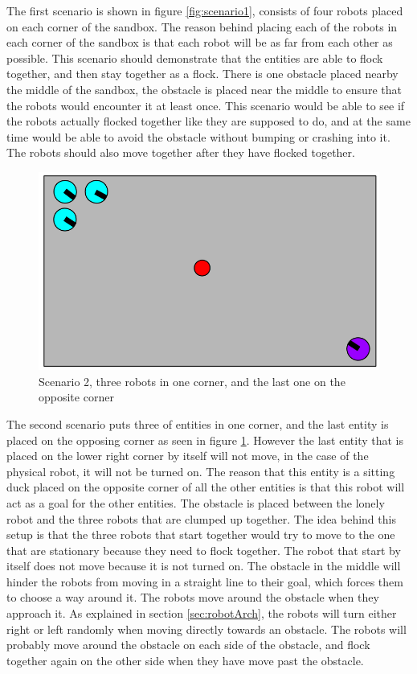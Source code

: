 The first scenario is shown in figure \ref{fig:scenario1}, consists of four robots placed on each corner of the sandbox. The reason behind placing each of the robots in each corner of the sandbox is that each robot will be as far from each other as possible. This scenario should demonstrate that the entities are able to flock together, and then stay together as a flock. There is one obstacle placed nearby the middle of the sandbox, the obstacle is placed near the middle to ensure that the robots would encounter it at least once. This scenario would be able to see if the robots actually flocked together like they are supposed to do, and at the same time would be able to avoid the obstacle without bumping or crashing into it. The robots should also move together after they have flocked together.

\begin{figure}[h]
\begin{center}
\includegraphics[width=0.8\linewidth]{figs/scenario1}
\end{center}
\caption[scenario 2]{Scenario 2, three robots in one corner, and the last one on the opposite corner}
\label{fig:scenario2}
\end{figure}

The second scenario puts three of entities in one corner, and the last entity is placed on the opposing corner as seen in figure \ref{fig:scenario2}. However the last entity that is placed on the lower right corner by itself will not move, in the case of the physical robot, it will not be turned on. The reason that this entity is a sitting duck placed on the opposite corner of all the other entities is that this robot will act as a goal for the other entities. The obstacle is placed between the lonely robot and the three robots that are clumped up together. The idea behind this setup is that the three robots that start together would try to move to the one that are stationary because they need to flock together. The robot that start by itself does not move because it is not turned on.
The obstacle in the middle will hinder the robots from moving in a straight line to their goal, which forces them to choose a way around it. The robots move around the obstacle when they approach it. As explained in section \ref{sec:robotArch}, the robots will turn either right or left randomly when moving directly towards an obstacle. The robots will probably move around the obstacle on each side of the obstacle, and flock together again on the other side when they have move past the obstacle.

